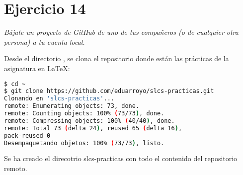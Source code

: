 \section{Ejercicio 14}
\begin{center}
    \parbox{12cm}{\justify\textit{
        Bájate un proyecto de GitHub de uno de tus compañeros (o de cualquier otra  persona) a tu cuenta local.
    }}
\end{center}

Desde el directorio , se clona el repositorio donde están las prácticas de la asignatura en \LaTeX :
\begin{lstlisting}[basicstyle=\small,xrightmargin=.10\textwidth,xleftmargin=.10\textwidth,language=bash]
$ cd ~ 
$ git clone https://github.com/eduarroyo/slcs-practicas.git
Clonando en 'slcs-practicas'...
remote: Enumerating objects: 73, done.
remote: Counting objects: 100% (73/73), done.
remote: Compressing objects: 100% (40/40), done.
remote: Total 73 (delta 24), reused 65 (delta 16),
pack-reused 0
Desempaquetando objetos: 100% (73/73), listo.
\end{lstlisting}
Se ha creado el direcotrio slcs-practicas con todo el contenido del repositorio remoto.